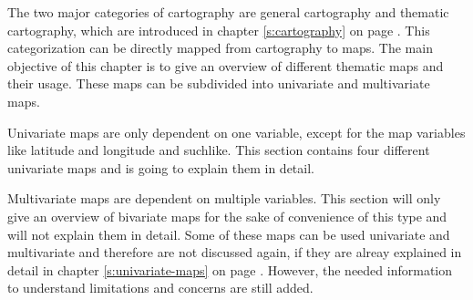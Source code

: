 The two major categories of cartography are general cartography and thematic cartography, which are introduced in chapter \ref{s:cartography} on page \pageref{s:cartography}. This categorization can be directly mapped from cartography to maps. The main objective of this chapter is to give an overview of different thematic maps and their usage. These maps can be subdivided into univariate and multivariate maps.

\label{s:univariate-maps}

Univariate maps are only dependent on one variable, except for the map variables like latitude and longitude and suchlike. This section contains four different univariate maps and is going to explain them in detail.






\label{s:choropleth}



Multivariate maps are dependent on multiple variables. This section will only give an overview of bivariate maps for the sake of convenience of this type and will not explain them in detail. Some of these maps can be used univariate and multivariate and therefore are not discussed again, if they are alreay explained in detail in chapter \ref{s:univariate-maps} on page \pageref{s:univariate-maps}. However, the needed information to understand limitations and concerns are still added.





